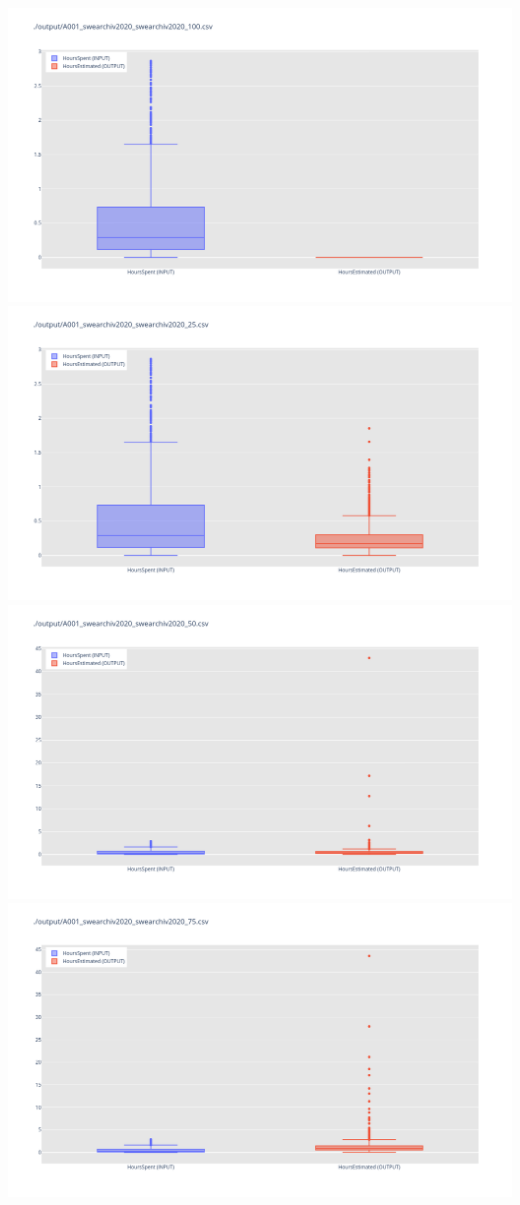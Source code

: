 \includegraphics[width=\textwidth]{Scripts/output/A001_swearchiv2020_swearchiv2020_100.csv.png}
\includegraphics[width=\textwidth]{Scripts/output/A001_swearchiv2020_swearchiv2020_25.csv.png}
\includegraphics[width=\textwidth]{Scripts/output/A001_swearchiv2020_swearchiv2020_50.csv.png}
\includegraphics[width=\textwidth]{Scripts/output/A001_swearchiv2020_swearchiv2020_75.csv.png}
